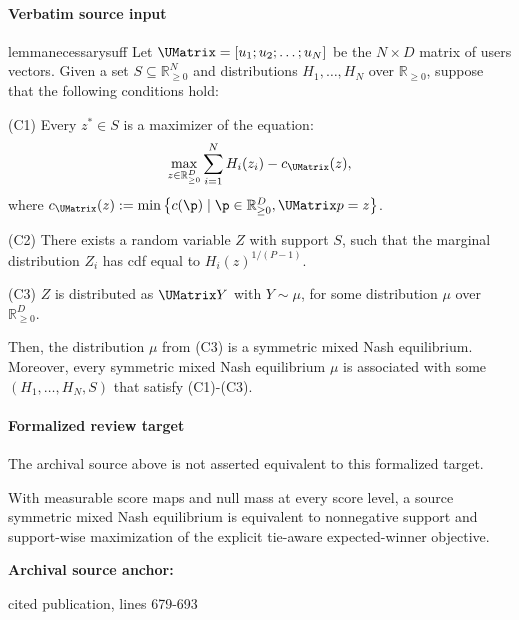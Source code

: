 \documentclass[10pt]{article}
\begin{document}
\paragraph{Verbatim source input}
\begin{ReviewVerbatim}
\begin{restatable}{lemma}{necessarysuff}
\label{claim:necessarysuff}
Let $\UMatrix = [u_1; u_2; \ldots; u_N]$ be the $N \times D$ matrix of users vectors. Given a set $S \subseteq \mathbb{R}_{\ge 0}^N$ and distributions $H_1, \ldots, H_N$ over $\mathbb{R}_{\ge 0}$, suppose that the following conditions hold:
\begin{description}
    \item{(C1)} Every $z^* \in S$ is a maximizer of the equation:
    \begin{equation}
\label{eq:reparam}
 \max_{z \in \mathbb{R}_{\ge 0}^D} \sum_{i=1}^N H_i(z_i) - c_{\UMatrix}(z),
\end{equation}
where $c_{\UMatrix}(z) := \min \left\{c(\p) \mid \p \in \mathbb{R}_{\ge 0}^D, \UMatrix p=z  \right\}$.
    \item{(C2)} There exists a random variable $Z$ with support $S$, such that the marginal distribution $Z_i$ has cdf equal to $H_i(z)^{1/(P-1)}$.
    \item{(C3)} $Z$ is distributed as $\UMatrix Y$ with $Y \sim \mu$, for some distribution $\mu$ over $\mathbb{R}_{\ge 0}^D$.
\end{description}
Then, the distribution $\mu$ from (C3) is a symmetric mixed Nash equilibrium. Moreover, every symmetric mixed Nash equilibrium $\mu$ is associated with some $(H_1, \ldots, H_N, S)$ that satisfy (C1)-(C3).
\end{restatable}
\end{ReviewVerbatim}


\paragraph{Formalized review target}
The archival source above is not asserted equivalent to this formalized target.
\begin{ReviewVerbatim}
With measurable score maps and null mass at every score level, a source symmetric mixed Nash equilibrium is equivalent to nonnegative support and support-wise maximization of the explicit tie-aware expected-winner objective.
\end{ReviewVerbatim}

\textbf{Archival source anchor:} {\footnotesize\raggedright cited publication, lines 679-\allowbreak{}693\par}
\end{document}
